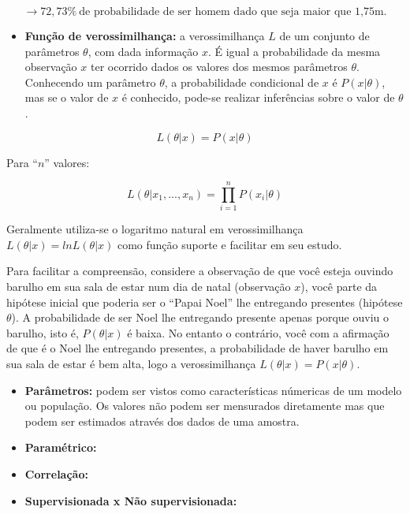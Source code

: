 \documentclass[
]{book}
\providecommand{\tightlist}{%
  \setlength{\itemsep}{0pt}\setlength{\parskip}{0pt}}
\begin{document}
\[→ 72,73\% \ \mbox{de probabilidade de ser homem dado que seja maior que 1,75m.}\]

\begin{itemize}
\tightlist
\item
  \textbf{Função de verossimilhança:} a verossimilhança \(L\) de um conjunto de parâmetros \(\theta\), com dada informação \(x\). É igual a probabilidade da mesma observação \(x\) ter ocorrido dados os valores dos mesmos parâmetros \(\theta\). Conhecendo um parâmetro \(\theta\), a probabilidade condicional de \(x\) é \(P(x|\theta)\), mas se o valor de \(x\) é conhecido, pode-se realizar inferências sobre o valor de \(\theta\) \citep{bolfarine2001introduccao}.
\end{itemize}

\begin{equation} 
 L(\theta |x)=P(x| \theta)
  \label{eq:fverossimilhanca}
\end{equation}

Para ``\(n\)'' valores:

\begin{equation} 
 L(\theta |x_1,..., x_n)=\prod_{i=1}^{n} P(x_i| \theta)
  \label{eq:fsumverossimilhanca}
\end{equation}

Geralmente utiliza-se o logaritmo natural em verossimilhança \(L(\theta |x)=ln L(\theta|x)\) como função suporte e facilitar em seu estudo.

Para facilitar a compreensão, considere a observação de que você esteja ouvindo barulho em sua sala de estar num dia de natal (observação \(x\)), você parte da hipótese inicial que poderia ser o ``Papai Noel'' lhe entregando presentes (hipótese \(\theta\)). A probabilidade de ser Noel lhe entregando presente apenas porque ouviu o barulho, isto é, \(P(\theta|x)\) é baixa. No entanto o contrário, você com a afirmação de que é o Noel lhe entregando presentes, a probabilidade de haver barulho em sua sala de estar é bem alta, logo a verossimilhança \(L(\theta|x)=P(x|\theta)\).

\begin{itemize}
\item
  \textbf{Parâmetros:} podem ser vistos como características númericas de um modelo ou população. Os valores não podem ser mensurados diretamente mas que podem ser estimados através dos dados de uma amostra.
\item
  \textbf{Paramétrico:}
\item
  \textbf{Correlação:}
\item
  \textbf{Supervisionada x Não supervisionada:}
\end{itemize}
\end{document}
